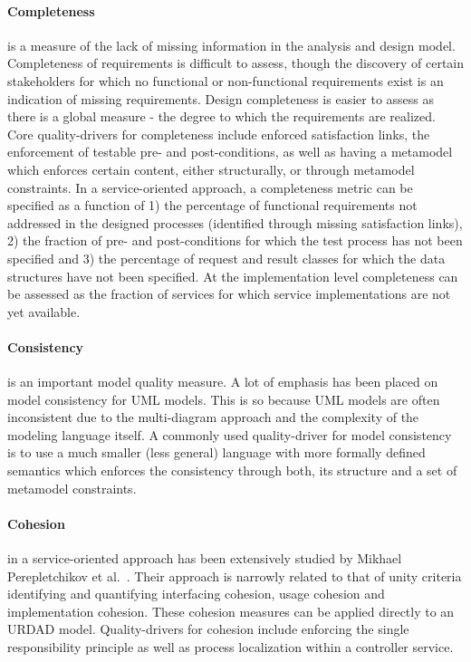 \paragraph{Completeness} is a measure of the lack of missing information in the analysis and design model. Completeness of requirements is difficult to assess, though the discovery of certain stakeholders for which no functional or non-functional requirements exist is an indication of missing requirements. Design completeness is easier to assess as there is a global measure - the degree to which the requirements are realized. Core quality-drivers for completeness include enforced satisfaction links, the enforcement of testable pre- and post-conditions, as well as having a metamodel which enforces certain content, either structurally, or through metamodel constraints. In a service-oriented approach, a completeness metric can be specified as a function of 1) the percentage of functional requirements not addressed in the designed processes (identified through missing satisfaction links)\cite{shim_design_2008}, 2) the fraction of pre- and post-conditions for which the test process has not been specified and 3) the percentage of request and result classes for which the data structures have not been specified. At the implementation level completeness can be assessed as the fraction of services for which service implementations are not yet available.

\paragraph{Consistency} is an important model quality measure. A lot of emphasis has been placed on model consistency for UML models. This is so because UML models are often inconsistent due to the multi-diagram approach and the complexity of the modeling language itself\cite{}. A commonly used quality-driver for model consistency is to use a much smaller (less general) language with more formally defined semantics which enforces the consistency through both, its structure and a set of metamodel constraints.

\paragraph{Cohesion} in a service-oriented approach has been extensively studied by Mikhael Perepletchikov et al.\ \cite{perepletchikov_cohesion_2007,perepletchikov_impact_2010}. Their approach is narrowly related to that of unity criteria \cite{gonzalez_unity_2009} identifying and quantifying interfacing cohesion, usage cohesion and implementation cohesion. These cohesion measures can be applied directly to an URDAD model. Quality-drivers for cohesion include enforcing the single responsibility principle as well as process localization within a controller service. 

